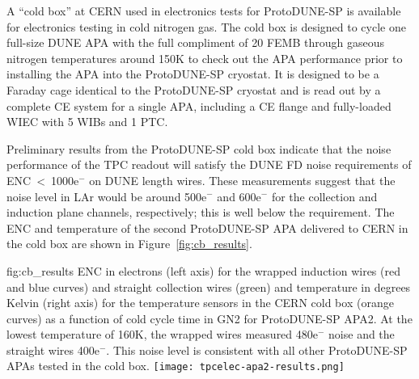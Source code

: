 A ``cold box'' at CERN used in electronics tests for ProtoDUNE-SP is available for electronics testing in cold nitrogen gas. The cold box is designed to cycle one full-size DUNE APA with the full compliment of 20 FEMB through gaseous nitrogen temperatures around 150K to check out the APA performance prior to installing the APA into the ProtoDUNE-SP cryostat. It is designed to be a Faraday cage identical to the ProtoDUNE-SP cryostat and is read out by a complete CE system for a single APA, including a CE flange and fully-loaded WIEC with 5 WIBs and 1 PTC.

Preliminary results from the ProtoDUNE-SP cold box indicate that
the noise performance of the TPC readout will satisfy the DUNE FD noise requirements of
ENC~<~1000e$^-$ on DUNE length wires. These measurements suggest that the noise level in
LAr would be around 500e$^-$ and 600e$^-$ for the collection and induction plane channels,
respectively; this is well below the requirement.  The ENC and temperature of the second ProtoDUNE-SP
APA delivered to CERN in the cold box are shown in Figure~\ref{fig:cb_results}.

\begin{dunefigure}
{fig:cb_results}
{ENC in electrons (left axis) for the wrapped induction wires (red and blue curves) and 
straight collection wires (green) and temperature in degrees Kelvin (right axis) for the temperature
sensors in the CERN cold box (orange curves) as a function of cold cycle time in GN2 for ProtoDUNE-SP APA2. 
At the lowest temperature of 160K, the wrapped wires measured 480e$^-$ noise and the straight 
wires 400e$^-$. This noise level is consistent with all other ProtoDUNE-SP APAs tested in the cold box.}
\texttt{[image: tpcelec-apa2-results.png]}
\end{dunefigure}
